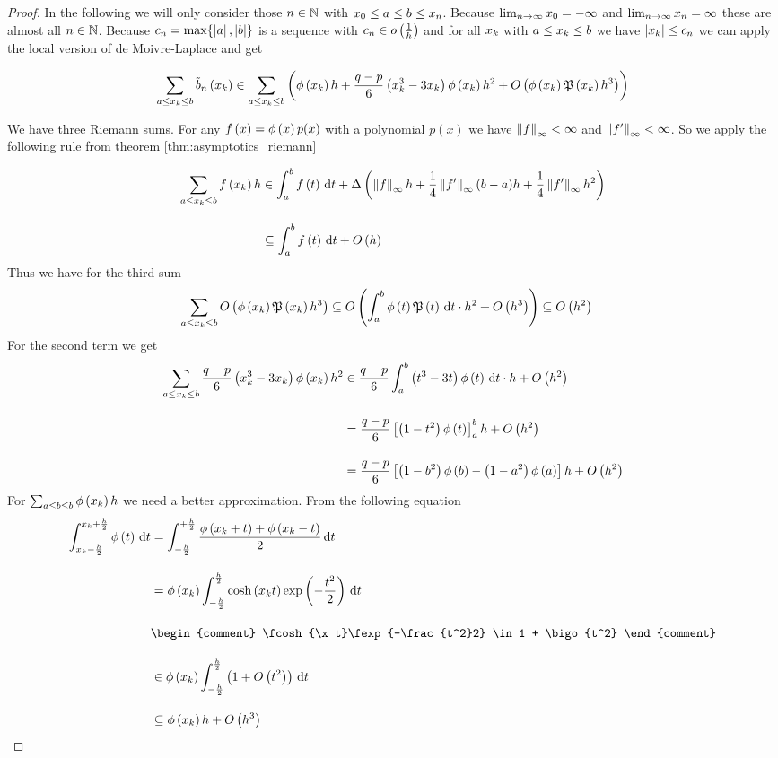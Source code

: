 \begin{proof}
  In the following we will only consider those $n\in\N$ with $\x[0] \le a \le b \le \x[n]$. Because $\lim_{n\to\infty} \x[0] = -\infty$ and $\lim_{n\to\infty} \x[n] = \infty$ these are almost all $n\in\N$. Because $c_n=\max\{\abs{a},\abs{b}\}$ is a sequence with $c_n\in\littleo{\frac 1h}$ and for all $\x$ with $a \le \x \le b$ we have $\abs{\x} \le c_n$ we can apply the local version of de Moivre-Laplace and get

  \begin{align}
    \sum_{a \le \x \le b} \bb{\x} \in \sum_{a \le \x \le b} \br{\fphi{\x} h +\frac{q-p}6 \left(\x^3 - 3\x\right) \fphi{\x} h^2 + \bigo{\fphi{\x}\pol{\x}h^3}}
  \end{align}

  We have three Riemann sums. For any $\f{x}=\fphi{x}p(x)$ with a polynomial $p(x)$ we have $\snorm{f} < \infty$ and $\snorm{f'}<\infty$. So we apply the following rule from theorem \ref{thm:asymptotics_riemann}

  \begin{align}
    \sum_{a \le \x \le b} \f{\x} h & \in \int_a^b \f{t} \d{t} + \bigabs{\snorm{f}h + \frac 14 \snorm{f'} (b-a) h + \frac 14 \snorm{f'} h^2} \bnl
    & \subseteq  \int_a^b \f{t} \d{t} + \bigo{h}
  \end{align}
  Thus we have for the third sum
  \begin{align}
    \sum_{a \le \x \le b} \bigo{\fphi{\x} \pol{\x} h^3} & \subseteq \bigo{\int_a^b \fphi{t} \pol{t} \d{t} \cdot h^2 + \bigo{h^3}} \subseteq \bigo{h^2}
  \end{align}
  For the second term we get
  \begin{align}
    \sum_{a \le \x \le b} \frac{q-p}6 \br{\x^3 - 3\x} \fphi{\x} h^2 &\in \frac{q-p}6 \int_a^b \br{t^3-3t}\fphi{t} \d{t} \cdot h + \bigo{h^2} \bnl
    &= \frac{q-p}6 \left[ \br{1-t^2}\fphi{t} \right]_a^b h + \bigo{h^2} \bnl
    &= \frac{q-p}6 \left[ \br{1-b^2}\fphi{b} - \br{1-a^2}\fphi{a} \right] h + \bigo{h^2}
  \end{align}
  For $\sum_{a\le b\le b} \fphi{\x}h$ we need a better approximation. From the following equation
  \begin{align}
    \int_{\x-\frac h2}^{\x+\frac h2} \fphi{t} \d{t} & = \int_{-\frac h2}^{+\frac h2} \frac{\fphi{\x+t}+\fphi{\x-t}}2 \d{t} \bnl
    & = \fphi{\x} \int_{-\frac h2}^{\frac h2} \fcosh{\x t} \fexp{-\frac{t^2}2} \d{t} \bnl
    &
    \begin{comment}
      \fcosh{\x t}\fexp{-\frac{t^2}2} \in 1 + \bigo{t^2}
    \end{comment} \bnl
    & \in \fphi{\x} \int_{-\frac h2}^{\frac h2} \br{1+\bigo{t^2}} \d{t} \bnl
    & \subseteq \fphi{\x} h + \bigo{h^3}
  \end{align}


\end{proof}
